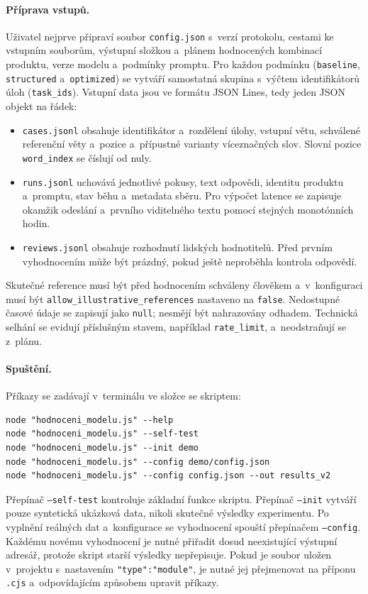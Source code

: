 \documentclass[11pt,a4paper]{article}
\begin{document}
\paragraph{Příprava vstupů.}
Uživatel nejprve připraví soubor \texttt{config.json} s~verzí protokolu,
cestami ke vstupním souborům, výstupní složkou a~plánem hodnocených
kombinací produktu, verze modelu a~podmínky promptu. Pro každou
podmínku (\texttt{baseline}, \texttt{structured} a~\texttt{optimized})
se vytváří samostatná skupina s~výčtem identifikátorů úloh
(\texttt{task\_ids}). Vstupní data jsou ve formátu JSON Lines, tedy
jeden JSON objekt na řádek:
\begin{itemize}[nosep]
\item \texttt{cases.jsonl} obsahuje identifikátor a~rozdělení úlohy,
vstupní větu, schválené referenční věty a~pozice a~přípustné varianty
víceznačných slov. Slovní pozice \texttt{word\_index} se číslují od nuly.
\item \texttt{runs.jsonl} uchovává jednotlivé pokusy, text odpovědi,
identitu produktu a~promptu, stav běhu a~metadata sběru. Pro výpočet
latence se zapisuje okamžik odeslání a~prvního viditelného textu pomocí
stejných monotónních hodin.
\item \texttt{reviews.jsonl} obsahuje rozhodnutí lidských hodnotitelů.
Před prvním vyhodnocením může být prázdný, pokud ještě neproběhla
kontrola odpovědí.
\end{itemize}
Skutečné reference musí být před hodnocením schváleny člověkem
a~v~konfiguraci musí být
\texttt{allow\_illustrative\_references} nastaveno na \texttt{false}.
Nedostupné časové údaje se zapisují jako \texttt{null}; nesmějí být
nahrazovány odhadem. Technická selhání se evidují příslušným stavem,
například \texttt{rate\_limit}, a~neodstraňují se z~plánu.

\paragraph{Spuštění.}
Příkazy se zadávají v~terminálu ve složce se skriptem:
\begin{lstlisting}[style=prompt,caption={Základní příkazy vyhodnocovacího skriptu},label={lst:hodnotici-prikazy}]
node "hodnoceni_modelu.js" --help
node "hodnoceni_modelu.js" --self-test
node "hodnoceni_modelu.js" --init demo
node "hodnoceni_modelu.js" --config demo/config.json
node "hodnoceni_modelu.js" --config config.json --out results_v2
\end{lstlisting}
Přepínač \texttt{--self-test} kontroluje základní funkce skriptu.
Přepínač \texttt{--init} vytváří pouze syntetická ukázková data,
nikoli skutečné výsledky experimentu. Po vyplnění reálných dat
a~konfigurace se vyhodnocení spouští přepínačem \texttt{--config}.
Každému novému vyhodnocení je nutné přiřadit dosud neexistující
výstupní adresář, protože skript starší výsledky nepřepisuje.
Pokud je soubor uložen v~projektu s~nastavením
\texttt{"type":"module"}, je nutné jej přejmenovat na příponu
\texttt{.cjs} a~odpovídajícím způsobem upravit příkazy.
\end{document}
